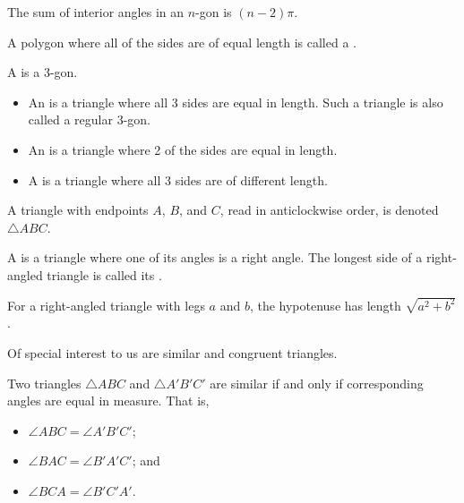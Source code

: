 \begin{proposition}
    The sum of interior angles in an $n$-gon is $(n-2)\pi$.
\end{proposition}

\begin{definition}
    A polygon where all of the sides are of equal length is called a .
\end{definition}

\begin{definition}
    A  is a 3-gon.
    \begin{itemize}
        \item An  is a triangle where all 3 sides are equal in length. Such a triangle is also called a regular 3-gon.
        \item An  is a triangle where 2 of the sides are equal in length.
        \item A  is a triangle where all 3 sides are of different length.
    \end{itemize}
    A triangle with endpoints $A$, $B$, and $C$, read in anticlockwise order, is denoted $\triangle ABC$.
\end{definition}

\begin{definition}
    A  is a triangle where one of its angles is a right angle. The longest side of a right-angled triangle is called its .
\end{definition}

\begin{theorem}[Pythagoras]
    For a right-angled triangle with legs $a$ and $b$, the hypotenuse has length $\sqrt{a^2 + b^2}$.
\end{theorem}

Of special interest to us are similar and congruent triangles.

\begin{definition}
    Two triangles $\triangle ABC$ and $\triangle A'B'C'$ are similar if and only if corresponding angles are equal in measure. That is,
    \begin{itemize}
        \item $\angle ABC = \angle A'B'C'$;
        \item $\angle BAC = \angle B'A'C'$; and
        \item $\angle BCA = \angle B'C'A'$.
    \end{itemize}
\end{definition}

